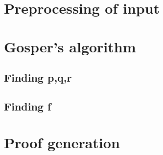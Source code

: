 \section{Preprocessing of input}
\section{Gosper's algorithm}
\subsection{Finding p,q,r}
\subsection{Finding f}
\section{Proof generation}
